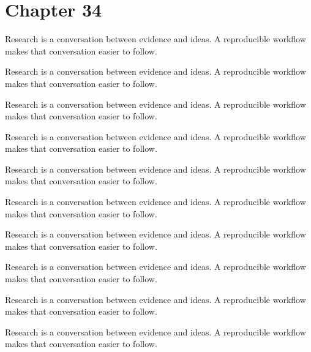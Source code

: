 \section*{Chapter 34}
Research is a conversation between evidence and ideas. A reproducible workflow makes that conversation easier to follow.

Research is a conversation between evidence and ideas. A reproducible workflow makes that conversation easier to follow.

Research is a conversation between evidence and ideas. A reproducible workflow makes that conversation easier to follow.

Research is a conversation between evidence and ideas. A reproducible workflow makes that conversation easier to follow.

Research is a conversation between evidence and ideas. A reproducible workflow makes that conversation easier to follow.

Research is a conversation between evidence and ideas. A reproducible workflow makes that conversation easier to follow.

Research is a conversation between evidence and ideas. A reproducible workflow makes that conversation easier to follow.

Research is a conversation between evidence and ideas. A reproducible workflow makes that conversation easier to follow.

Research is a conversation between evidence and ideas. A reproducible workflow makes that conversation easier to follow.

Research is a conversation between evidence and ideas. A reproducible workflow makes that conversation easier to follow.

\newpage
